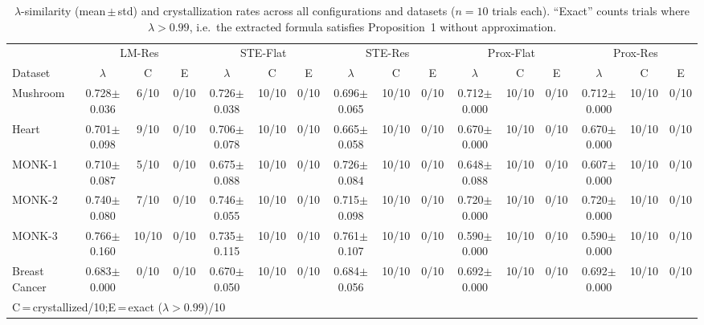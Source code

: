 \begin{table}[t]
\caption{$\lambda$-similarity (mean\,$\pm$\,std) and crystallization rates across all configurations and datasets ($n=10$ trials each). ``Exact'' counts trials where $\lambda > 0.99$, i.e.\ the extracted formula satisfies Proposition~1 without approximation.}
\label{tab:lambda}
\centering
\renewcommand{\arraystretch}{1.12}
\begin{tabular}{l ccc ccc ccc ccc ccc}
\toprule
& \multicolumn{3}{c}{LM-Res} & \multicolumn{3}{c}{STE-Flat} & \multicolumn{3}{c}{STE-Res} & \multicolumn{3}{c}{Prox-Flat} & \multicolumn{3}{c}{Prox-Res} \\
\cmidrule(lr){2-4}\cmidrule(lr){5-7}\cmidrule(lr){8-10}\cmidrule(lr){11-13}\cmidrule(lr){14-16}
Dataset & $\lambda$ & C & E & $\lambda$ & C & E & $\lambda$ & C & E & $\lambda$ & C & E & $\lambda$ & C & E \\
\midrule
Mushroom & 0.728$\pm$0.036 & 6/10 & 0/10 & 0.726$\pm$0.038 & 10/10 & 0/10 & 0.696$\pm$0.065 & 10/10 & 0/10 & 0.712$\pm$0.000 & 10/10 & 0/10 & 0.712$\pm$0.000 & 10/10 & 0/10 \\
Heart & 0.701$\pm$0.098 & 9/10 & 0/10 & 0.706$\pm$0.078 & 10/10 & 0/10 & 0.665$\pm$0.058 & 10/10 & 0/10 & 0.670$\pm$0.000 & 10/10 & 0/10 & 0.670$\pm$0.000 & 10/10 & 0/10 \\
MONK-1 & 0.710$\pm$0.087 & 5/10 & 0/10 & 0.675$\pm$0.088 & 10/10 & 0/10 & 0.726$\pm$0.084 & 10/10 & 0/10 & 0.648$\pm$0.088 & 10/10 & 0/10 & 0.607$\pm$0.000 & 10/10 & 0/10 \\
MONK-2 & 0.740$\pm$0.080 & 7/10 & 0/10 & 0.746$\pm$0.055 & 10/10 & 0/10 & 0.715$\pm$0.098 & 10/10 & 0/10 & 0.720$\pm$0.000 & 10/10 & 0/10 & 0.720$\pm$0.000 & 10/10 & 0/10 \\
MONK-3 & 0.766$\pm$0.160 & 10/10 & 0/10 & 0.735$\pm$0.115 & 10/10 & 0/10 & 0.761$\pm$0.107 & 10/10 & 0/10 & 0.590$\pm$0.000 & 10/10 & 0/10 & 0.590$\pm$0.000 & 10/10 & 0/10 \\
Breast Cancer & 0.683$\pm$0.000 & 0/10 & 0/10 & 0.670$\pm$0.050 & 10/10 & 0/10 & 0.684$\pm$0.056 & 10/10 & 0/10 & 0.692$\pm$0.000 & 10/10 & 0/10 & 0.692$\pm$0.000 & 10/10 & 0/10 \\
\midrule
\multicolumn{16}{l}{\small C\,=\,crystallized/10;\;E\,=\,exact ($\lambda>0.99$)/10} \\
\bottomrule
\end{tabular}
\end{table}